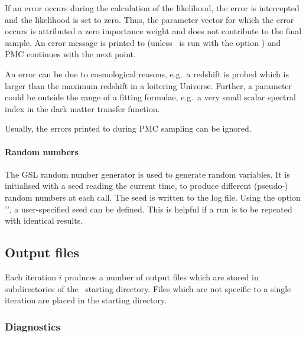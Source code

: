 \documentclass[11pt, chapterprefix, headsepline]{scrartcl}
\begin{document}
If an error occurs during the calculation of the likelihood, the error is
intercepted and the likelihood is set to zero. Thus, the parameter
vector for which the error occurs is attributed a zero importance
weight and does not contribute to the final sample. An error message
is printed to  (unless \CosmoPMC\ is run with the
option ) and PMC continues with the next point.

An error can be due to cosmological reasons, e.g.~a redshift is probed
which is larger than the maximum redshift in a loitering
Universe. Further, a parameter could be outside the range of a fitting
formulae, e.g.~a very small scalar spectral index in the dark matter
transfer function.

Usually, the errors printed to  during PMC sampling can be ignored.

\paragraph{Random numbers}
\label{sec:random}

The GSL random number generator is used to generate random variables.
It is initialised with a seed reading the current time, to produce
different (pseudo-) random numbers at each call. The seed is written
to the log file. Using the option '', a user-specified
seed can be defined. This is helpful if a run is to be repeated with
identical results.


\subsection{Output files}

Each iteration $i$ produces a number of output files which are stored
in subdirectories  of the \CosmoPMC\ starting
directory. Files which are not specific to a single iteration are
placed in the starting directory.

\subsubsection{Diagnostics}
\label{sec:diagnostics}
\end{document}
